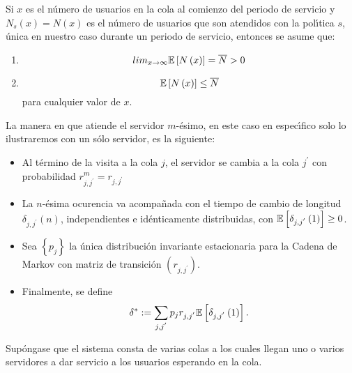 Si $x$ es el n{\'u}mero de usuarios en la cola al comienzo del
periodo de servicio y $N_{s}\left(x\right)=N\left(x\right)$ es el
n{\'u}mero de usuarios que son atendidos con la pol{\'\i}tica $s$,
{\'u}nica en nuestro caso durante un periodo de servicio, entonces
se asume que:
\begin{enumerate}
\item
\begin{equation}\label{S1}
lim_{x\rightarrow\infty}\mathbb{E}\left[N\left(x\right)\right]=\overline{N}>0
\end{equation}
\item
\begin{equation}\label{S2}
\mathbb{E}\left[N\left(x\right)\right]\leq \overline{N} \end{equation}
para cualquier valor de $x$.
\end{enumerate}
La manera en que atiende el servidor $m$-{\'e}simo, en este caso
en espec{\'\i}fico solo lo ilustraremos con un s{\'o}lo servidor,
es la siguiente:
\begin{itemize}
\item Al t{\'e}rmino de la visita a la cola $j$, el servidor se
cambia a la cola $j^{'}$ con probabilidad
$r_{j,j^{'}}^{m}=r_{j,j^{'}}$

\item La $n$-{\'e}sima ocurencia va acompa{\~n}ada con el tiempo
de cambio de longitud $\delta_{j,j^{'}}\left(n\right)$,
independientes e id{\'e}nticamente distribuidas, con
$\mathbb{E}\left[\delta_{j,j^{'}}\left(1\right)\right]\geq0$.

\item Sea $\left\{p_{j}\right\}$ la {\'u}nica distribuci{\'o}n
invariante estacionaria para la Cadena de Markov con matriz de
transici{\'o}n $\left(r_{j,j^{'}}\right)$.

\item Finalmente, se define
\begin{equation}
\delta^{*}:=\sum_{j,j^{'}}p_{j}r_{j,j^{'}}\mathbb{E}\left[\delta_{j,j^{'}}\left(1\right)\right].
\end{equation}
\end{itemize}

Sup\'ongase que el sistema consta de varias colas a los cuales
llegan uno o varios servidores a dar servicio a los usuarios
esperando en la cola.\\


